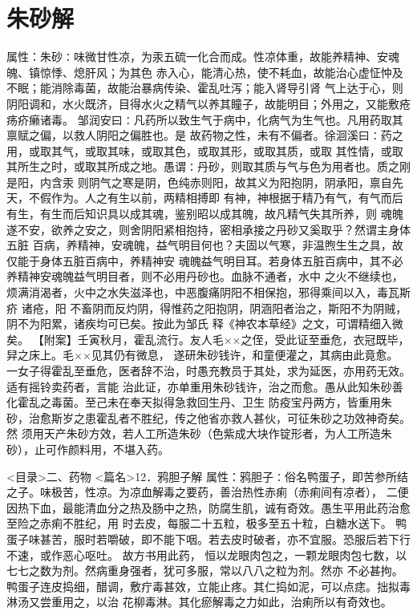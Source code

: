 \documentclass[a4paper,12pt,UTF8,twoside]{ctexbook}
\begin{document}
\chapter{朱砂解}
属性：朱砂∶味微甘性凉，为汞五硫一化合而成。性凉体重，故能养精神、安魂魄、镇惊悸、熄肝风；为其色 
赤入心，能清心热，使不耗血，故能治心虚怔忡及不眠；能消除毒菌，故能治暴病传染、霍乱吐泻；能入肾导引肾 
气上达于心，则阴阳调和，水火既济，目得水火之精气以养其瞳子，故能明目；外用之，又能敷疮疡疥癞诸毒。 
邹润安曰∶凡药所以致生气于病中，化病气为生气也。凡用药取其禀赋之偏，以救人阴阳之偏胜也。是 
故药物之性，未有不偏者。徐洄溪曰∶药之用，或取其气，或取其味，或取其色，或取其形，或取其质，或取 
其性情，或取其所生之时，或取其所成之地。愚谓∶丹砂，则取其质与气与色为用者也。质之刚是阳，内含汞 
则阴气之寒是阴，色纯赤则阳，故其义为阳抱阴，阴承阳，禀自先天，不假作为。人之有生以前，两精相搏即 
有神，神根据于精乃有气，有气而后有生，有生而后知识具以成其魂，鉴别昭以成其魄，故凡精气失其所养，则 
魂魄遂不安，欲养之安之，则舍阴阳紧相抱持，密相承接之丹砂又奚取乎？然谓主身体五脏 
百病，养精神，安魂魄，益气明目何也？夫固以气寒，非温煦生生之具，故仅能于身体五脏百病中，养精神安 
魂魄益气明目耳。若身体五脏百病中，其不必养精神安魂魄益气明目者，则不必用丹砂也。血脉不通者，水中 
之火不继续也，烦满消渴者，火中之水失滋泽也，中恶腹痛阴阳不相保抱，邪得乘间以入，毒瓦斯疥 诸疮，阳 
不畜阴而反灼阴，得惟药之阳抱阴，阴涵阳者治之，斯阳不为阴贼，阴不为阳累，诸疾均可已矣。按此为邹氏 
释《神农本草经》之文，可谓精细入微矣。 
【附案】壬寅秋月，霍乱流行。友人毛××之侄，受此证至垂危，衣冠既毕，舁之床上。毛××见其仍有微息， 
遂研朱砂钱许，和童便灌之，其病由此竟愈。 
一女子得霍乱至垂危，医者辞不治，时愚充教员于其处，求为延医，亦用药无效。适有摇铃卖药者，言能 
治此证，亦单重用朱砂钱许，治之而愈。愚从此知朱砂善化霍乱之毒菌。至己未在奉天拟得急救回生丹、卫生 
防疫宝丹两方，皆重用朱砂，治愈斯岁之患霍乱者不胜纪，传之他省亦救人甚伙，可征朱砂之功效神奇矣。然 
须用天产朱砂方效，若人工所造朱砂（色紫成大块作锭形者，为人工所造朱砂），止可作颜料用，不堪入药。 

<目录>二、药物
<篇名>12．鸦胆子解
属性：鸦胆子∶俗名鸭蛋子，即苦参所结之子。味极苦，性凉。为凉血解毒之要药，善治热性赤痢（赤痢间有凉者）， 
二便因热下血，最能清血分之热及肠中之热，防腐生肌，诚有奇效。愚生平用此药治愈至险之赤痢不胜纪，用 
时去皮，每服二十五粒，极多至五十粒，白糖水送下。 
鸭蛋子味甚苦，服时若嚼破，即不能下咽。若去皮时破者，亦不宜服。恐服后若下行不速，或作恶心呕吐。 
故方书用此药， 
恒以龙眼肉包之，一颗龙眼肉包七数，以七七之数为剂。然病重身强者，犹可多服，常以八八之粒为剂。然亦 
不必甚拘。 
鸭蛋子连皮捣细，醋调，敷疔毒甚效，立能止疼。其仁捣如泥，可以点痣。拙拟毒淋汤又尝重用之，以治 
花柳毒淋。其化瘀解毒之力如此，治痢所以有奇效也。 
\end{document}
